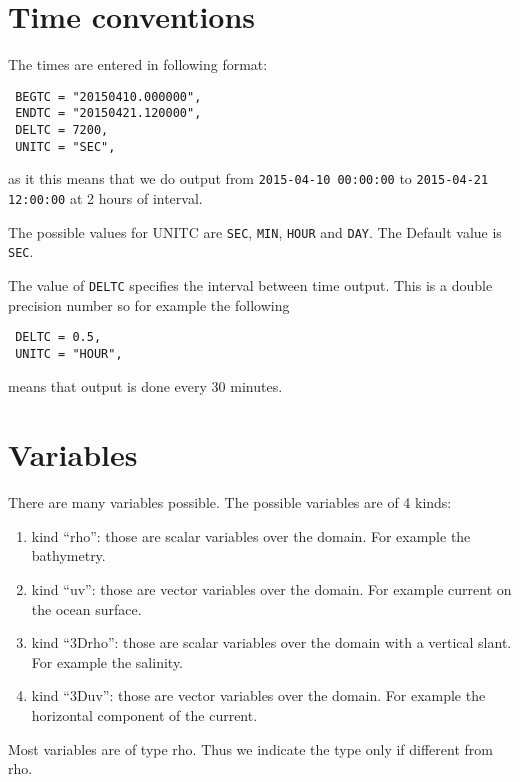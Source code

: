 \documentclass[12pt]{amsart}
\begin{document}
\section{Time conventions}
The times are entered in following format:
\begin{verbatim}
 BEGTC = "20150410.000000",
 ENDTC = "20150421.120000",
 DELTC = 7200, 
 UNITC = "SEC", 
\end{verbatim}
as it this means that we do output from {\tt 2015-04-10 00:00:00} to {\tt 2015-04-21 12:00:00} at 2 hours of interval.

The possible values for UNITC are {\tt SEC}, {\tt MIN}, {\tt HOUR} and {\tt DAY}. The Default value is {\tt SEC}.

The value of {\tt DELTC} specifies the interval between time output. This is a double precision number so for example the following
\begin{verbatim}
 DELTC = 0.5, 
 UNITC = "HOUR", 
\end{verbatim}
means that output is done every $30$ minutes.


\section{Variables}

There are many variables possible. The possible variables are of 4 kinds:
\begin{enumerate}
\item kind ``rho'': those are scalar variables over the domain. For example the bathymetry.
\item kind ``uv'': those are vector variables over the domain. For example current on the ocean surface.
\item kind ``3Drho'': those are scalar variables over the domain with a vertical slant. For example the salinity.
\item kind ``3Duv'': those are vector variables over the domain. For example the horizontal component of the current.
\end{enumerate}
Most variables are of type rho. Thus we indicate the type only if different from rho.
\end{document}
